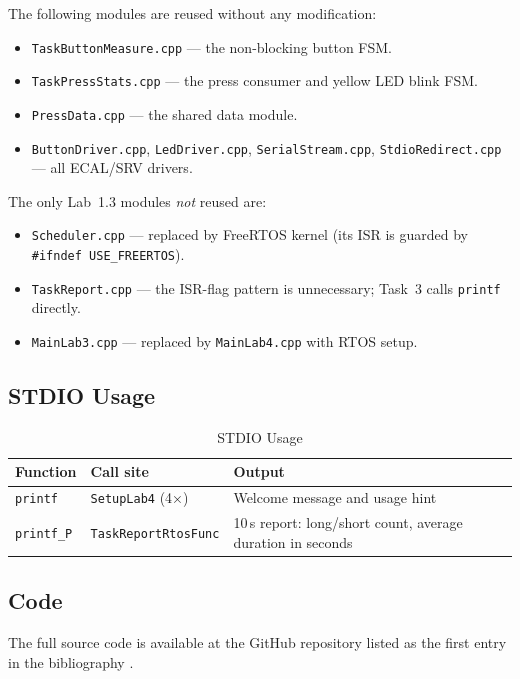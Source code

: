 \documentclass[12pt]{article}
\begin{document}
The following modules are reused without any modification:
\begin{itemize}
  \item \texttt{TaskButtonMeasure.cpp} — the non-blocking button FSM.
  \item \texttt{TaskPressStats.cpp} — the press consumer and yellow LED blink FSM.
  \item \texttt{PressData.cpp} — the shared data module.
  \item \texttt{ButtonDriver.cpp}, \texttt{LedDriver.cpp}, \texttt{SerialStream.cpp}, \texttt{StdioRedirect.cpp} — all ECAL/SRV drivers.
\end{itemize}

The only Lab~1.3 modules \emph{not} reused are:
\begin{itemize}
  \item \texttt{Scheduler.cpp} — replaced by FreeRTOS kernel (its ISR is guarded by \texttt{\#ifndef USE\_FREERTOS}).
  \item \texttt{TaskReport.cpp} — the ISR-flag pattern is unnecessary; Task~3 calls \texttt{printf} directly.
  \item \texttt{MainLab3.cpp} — replaced by \texttt{MainLab4.cpp} with RTOS setup.
\end{itemize}

\subsection{STDIO Usage}

\begin{table}[H]
\centering
\begin{tabular}{@{}lp{4cm}p{5.5cm}@{}}
\toprule
\textbf{Function} & \textbf{Call site} & \textbf{Output} \\
\midrule
\texttt{printf}
  & \texttt{SetupLab4} (4×)
  & Welcome message and usage hint \\
\texttt{printf\_P}
  & \texttt{TaskReportRtosFunc}
  & 10\,s report: long/short count, average duration in seconds \\
\bottomrule
\end{tabular}
\caption{STDIO Usage}
\label{tab:stdio}
\end{table}

\subsection{Code}

The full source code is available at the GitHub repository listed as the first entry in the bibliography \cite{code}.
\end{document}
